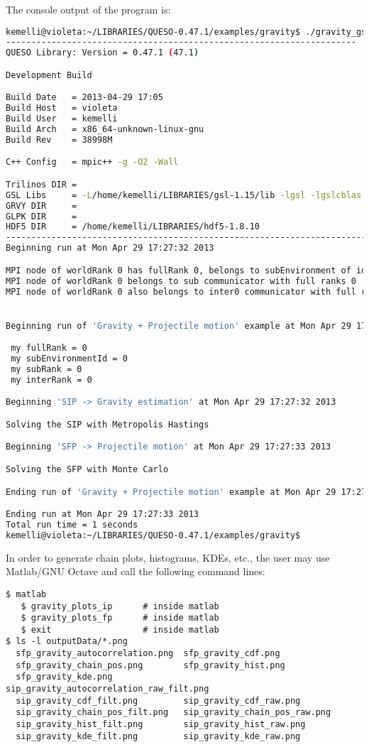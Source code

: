 The console output of the program is:
\begin{lstlisting}[caption={Console output of program \texttt{gravity\_gsl}}, label={code:console_output},language={bash}]
kemelli@violeta:~/LIBRARIES/QUESO-0.47.1/examples/gravity$ ./gravity_gsl gravity_inv_fwd.inp 
---------------------------------------------------------------------
QUESO Library: Version = 0.47.1 (47.1)

Development Build

Build Date   = 2013-04-29 17:05
Build Host   = violeta
Build User   = kemelli
Build Arch   = x86_64-unknown-linux-gnu
Build Rev    = 38998M

C++ Config   = mpic++ -g -O2 -Wall

Trilinos DIR = 
GSL Libs     = -L/home/kemelli/LIBRARIES/gsl-1.15/lib -lgsl -lgslcblas -lm
GRVY DIR     = 
GLPK DIR     = 
HDF5 DIR     = /home/kemelli/LIBRARIES/hdf5-1.8.10
--------------------------------------------------------------------------------------------------------------
Beginning run at Mon Apr 29 17:27:32 2013

MPI node of worldRank 0 has fullRank 0, belongs to subEnvironment of id 0, and has subRank 0
MPI node of worldRank 0 belongs to sub communicator with full ranks 0
MPI node of worldRank 0 also belongs to inter0 communicator with full ranks 0, and has inter0Rank 0


Beginning run of 'Gravity + Projectile motion' example at Mon Apr 29 17:27:32 2013

 my fullRank = 0
 my subEnvironmentId = 0
 my subRank = 0
 my interRank = 0

Beginning 'SIP -> Gravity estimation' at Mon Apr 29 17:27:32 2013

Solving the SIP with Metropolis Hastings

Beginning 'SFP -> Projectile motion' at Mon Apr 29 17:27:33 2013

Solving the SFP with Monte Carlo

Ending run of 'Gravity + Projectile motion' example at Mon Apr 29 17:27:33 2013

Ending run at Mon Apr 29 17:27:33 2013
Total run time = 1 seconds
kemelli@violeta:~/LIBRARIES/QUESO-0.47.1/examples/gravity$ 
\end{lstlisting}


In order to generate chain plots, histograms, KDEs, etc., the user may use Matlab/GNU Octave and call the following command lines:
\begin{lstlisting}
$ matlab
   $ gravity_plots_ip      # inside matlab
   $ gravity_plots_fp      # inside matlab
   $ exit                  # inside matlab
$ ls -l outputData/*.png
  sfp_gravity_autocorrelation.png  sfp_gravity_cdf.png
  sfp_gravity_chain_pos.png        sfp_gravity_hist.png
  sfp_gravity_kde.png              sip_gravity_autocorrelation_raw_filt.png
  sip_gravity_cdf_filt.png         sip_gravity_cdf_raw.png
  sip_gravity_chain_pos_filt.png   sip_gravity_chain_pos_raw.png
  sip_gravity_hist_filt.png        sip_gravity_hist_raw.png
  sip_gravity_kde_filt.png         sip_gravity_kde_raw.png
\end{lstlisting}

